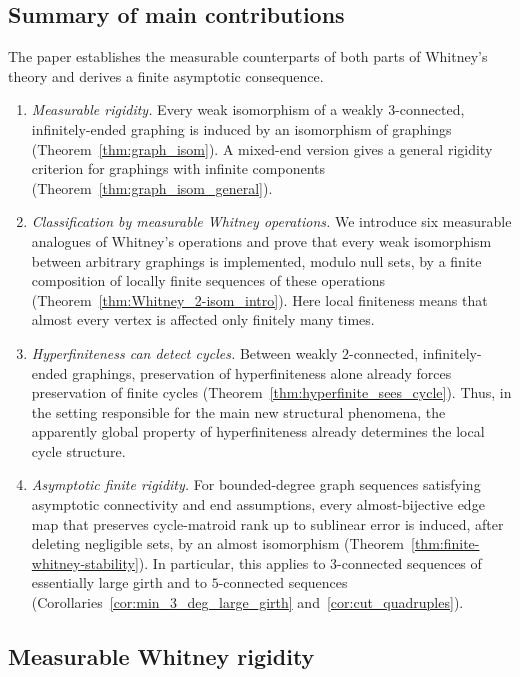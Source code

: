 \documentclass{article}
\theoremstyle{plain}
\theoremstyle{definition}
\begin{document}
\subsection{Summary of main contributions}
The paper establishes the measurable counterparts of both parts of Whitney's theory and derives a finite asymptotic consequence.
\begin{enumerate}
    \item \emph{Measurable rigidity.} Every weak isomorphism of a weakly $3$-connected, infinitely-ended graphing is induced by an isomorphism of graphings (Theorem~\ref{thm:graph_isom}). A mixed-end version gives a general rigidity criterion for graphings with infinite components (Theorem~\ref{thm:graph_isom_general}).

    \item \emph{Classification by measurable Whitney operations.} We introduce six measurable analogues of Whitney's operations and prove that every weak isomorphism between arbitrary graphings is implemented, modulo null sets, by a finite composition of locally finite sequences of these operations (Theorem~\ref{thm:Whitney_2-isom_intro}). Here local finiteness means that almost every vertex is affected only finitely many times.

    \item \emph{Hyperfiniteness can detect cycles.} Between weakly \(2\)-connected, infinitely-ended graphings, preservation of hyperfiniteness alone already forces preservation of finite cycles (Theorem~\ref{thm:hyperfinite_sees_cycle}). Thus, in the setting responsible for the main new structural phenomena, the apparently global property of hyperfiniteness already determines the local cycle structure.

    \item \emph{Asymptotic finite rigidity.} For bounded-degree graph sequences satisfying asymptotic connectivity and end assumptions, every almost-bijective edge map that preserves cycle-matroid rank up to sublinear error is induced, after deleting negligible sets, by an almost isomorphism (Theorem~\ref{thm:finite-whitney-stability}). In particular, this applies to $3$-connected sequences of essentially large girth and to $5$-connected sequences (Corollaries~\ref{cor:min_3_deg_large_girth} and~\ref{cor:cut_quadruples}).
\end{enumerate}





\subsection{Measurable Whitney rigidity}
\end{document}
